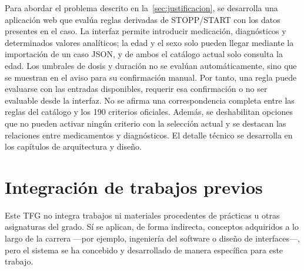 Para abordar el problema descrito en la~\cref{sec:justificacion}, se
desarrolla una aplicación web que evalúa reglas derivadas de STOPP/START con
los datos presentes en el caso. La interfaz permite introducir medicación,
diagnósticos y determinados valores analíticos; la edad y el sexo solo pueden
llegar mediante la importación de un caso JSON, y de ambos el catálogo actual
solo consulta la edad. Los umbrales de dosis y duración no se evalúan
automáticamente, sino que se muestran en el aviso para su confirmación manual.
Por tanto, una regla puede evaluarse con las entradas disponibles, requerir esa
confirmación o no ser evaluable desde la interfaz. No se afirma una
correspondencia completa entre las reglas del catálogo y los 190 criterios
oficiales.
Además, se deshabilitan opciones que no pueden activar ningún criterio con la
selección actual y se destacan las relaciones entre medicamentos y
diagnósticos. El detalle técnico se desarrolla en los capítulos de
arquitectura y diseño.

\section{Integración de trabajos previos}
\label{sec:trabajos-previos}

Este TFG no integra trabajos ni materiales procedentes de prácticas u otras
asignaturas del grado. Sí se aplican, de forma indirecta, conceptos adquiridos
a lo largo de la carrera ---por ejemplo, ingeniería del software o diseño de
interfaces---, pero el sistema se ha
concebido y desarrollado de manera específica para este trabajo.